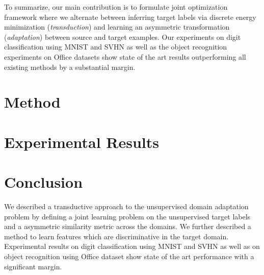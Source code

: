 \documentclass{article}
\begin{document}
To summarize, our main contribution is to formulate joint optimization framework where we alternate between inferring target labels via discrete energy minimization (\textit{transduction}) and learning an asymmetric transformation (\textit{adaptation}) between source and target examples. Our experiments on digit classification using MNIST \cite{mnist} and SVHN\cite{svhn} as well as the object recognition experiments on Office \cite{office} datasets show state of the art results outperforming all existing methods by a substantial margin.


\section{Method} 



\section{Experimental Results}

\section{Conclusion} 
We described a transductive approach to the unsupervised domain adaptation problem by defining a joint learning problem on the unsupervised target labels and a asymmetric similarity metric across the domains. We further described a method to learn features which are discriminative in the target domain. Experimental results on digit classification using MNIST\cite{mnist} and SVHN\cite{svhn} as well as on object recognition using Office\cite{office} dataset show state of the art performance with a significant margin.



\clearpage


\end{document}
